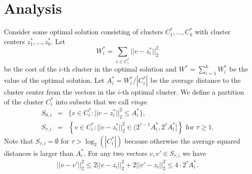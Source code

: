 \documentclass[11pt,twoside]{article}
\begin{document}
 



\section{Analysis}\label{analysis}
Consider some optimal solution consisting of clusters $C_1^*,\dots,C^*_k$ with cluster centers $z_1^*,\dots,z^*_k$. Let
$$W^*_i=\sum_{v\in C^*_i} ||v-z_i^*||_2^2$$
be the cost of the $i$-th cluster in the optimal solution and 
 $W^*=\sum_{i=1}^kW^*_i$ be the value of the optimal solution. 
Let $A^*_i=W^*_i/|C^*_i|$ be the average distance to the cluster center from the vectors in the $i$-th optimal cluster. 
We define a partition of the cluster $C_i^*$ into subsets that we call {\it rings}: 
\begin{eqnarray}
S_{0,i}&=&\{v\in C^*_i: ||v-z^*_i||^2_2\le A^*_i\},\\
S_{\tau,i}&=&\left\{v\in C^*_i: ||v-z^*_i||^2_2\in ( 2^{\tau-1}A^*_i,2^{\tau}A^*_i]\right\} \mbox{ for }\tau\ge 1.
\end{eqnarray}
Note that $S_{\tau,i}=\emptyset $  for $\tau > \log_2 (|C_i^*|)$ because otherwise the average squared distances is larger than $A^*_i$.
For any two vectors $v,v'\in S_{\tau,i}$  we have 
\begin{eqnarray}\label{triangleInequality}
||v-v'||^2_2\le 2 ||v-z_i||^2_2+2||v'-z_i||^2_2\le 4\cdot 2^{\tau}A^*_i.
\end{eqnarray}
\end{document}

